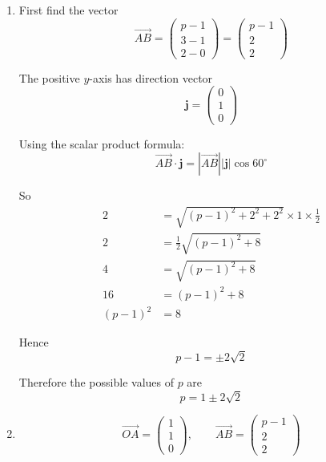\documentclass[leqno]{article}
\begin{document}
\begin{enumerate}[
  label=\textbf{\arabic*.},
  leftmargin=*,
  topsep=0pt,
  partopsep=0pt,
  parsep=0pt
]
\begin{djsSolution}
\begin{enumerate}[label=\textbf{(\alph*)}]
  \item
  First find the vector
  \[
  \overrightarrow{AB}
  =\begin{pmatrix}p-1\\3-1\\2-0\end{pmatrix}
  =\begin{pmatrix}p-1\\2\\2\end{pmatrix}
  \]

  The positive \(y\)-axis has direction vector
  \[
  \mathbf{j}=\begin{pmatrix}0\\1\\0\end{pmatrix}
  \]

  Using the scalar product formula:
  \[
  \overrightarrow{AB}\cdot \mathbf{j}
  =\left|\overrightarrow{AB}\right|\left|\mathbf{j}\right|\cos 60^\circ
  \]

  So
  \begin{align*}
  2&=\sqrt{(p-1)^2+2^2+2^2}\times 1\times \frac12 \\
  2&=\frac12\sqrt{(p-1)^2+8} \\
  4&=\sqrt{(p-1)^2+8} \\
  16&=(p-1)^2+8 \\
  (p-1)^2&=8
  \end{align*}

  Hence
  \[
  p-1=\pm 2\sqrt{2}
  \]

  Therefore the possible values of \(p\) are
  \[
  p=1\pm 2\sqrt{2}
  \]

  \item
  \[
  \overrightarrow{OA}=\begin{pmatrix}1\\1\\0\end{pmatrix},
  \qquad
  \overrightarrow{AB}=\begin{pmatrix}p-1\\2\\2\end{pmatrix}
  \]


\end{enumerate}
\end{djsSolution}
\end{enumerate}
\end{document}
